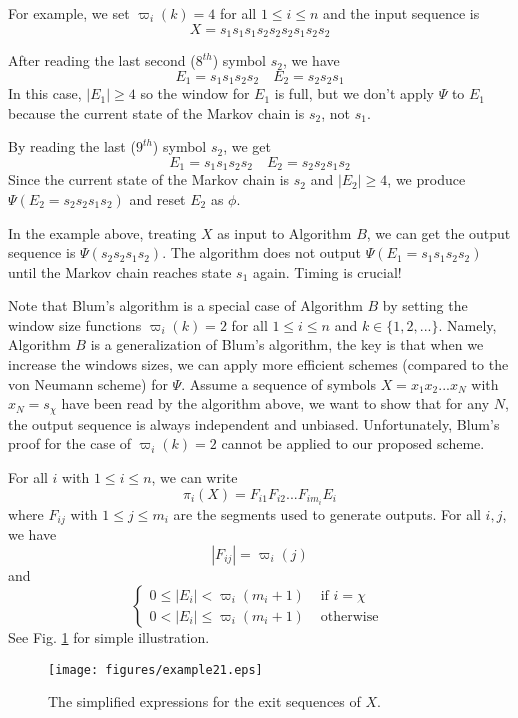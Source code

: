 \documentclass[journal]{IEEEtran}
\begin{document}
For example, we set $\varpi_i(k)=4$ for all $1\leq i\leq n$ and the input sequence is $$X=s_1s_1s_1s_2s_2s_2s_1s_2s_2$$

After reading the last second ($8^{th}$) symbol $s_2$, we have
$$E_1=s_1s_1s_2s_2 \quad E_2=s_2s_2s_1$$
In this case, $|E_1|\geq 4$ so the window for $E_1$ is full, but we don't apply $\Psi$ to $E_1$ because
the current state of the Markov chain is $s_2$, not $s_1$.

By reading the last ($9^{th}$) symbol $s_2$, we get
$$E_1=s_1s_1s_2s_2 \quad E_2=s_2s_2s_1s_2$$
Since the current state of the Markov chain is $s_2$ and $|E_2|\geq 4$,
we produce $\Psi(E_2=s_2s_2s_1s_2)$ and reset $E_2$ as $\phi$.

In the example above, treating $X$ as input to Algorithm $B$, we can get the output sequence is
$\Psi(s_2s_2s_1s_2)$. The algorithm does not output $\Psi(E_1=s_1s_1s_2s_2)$ until the Markov chain reaches state $s_1$ again. Timing is crucial!

Note that Blum's algorithm is a special case of Algorithm $B$ by setting the window size functions $\varpi_i(k)=2$ for all $1\leq i\leq n$ and $k\in \{1,2,...\}$.
Namely, Algorithm $B$ is a generalization of Blum's algorithm, the key is that when we increase the windows sizes, we can apply more efficient schemes (compared to the von Neumann scheme) for $\Psi$.
Assume a sequence of symbols $X=x_1x_2...x_N$ with $x_N=s_\chi$ have been read by the algorithm above, we want to show that for any $N$, the output
sequence is always independent and unbiased. Unfortunately, Blum's
proof for the case of $\varpi_i(k)=2$ cannot be applied to our proposed scheme.

For all $i$ with $1\leq i\leq n$, we can write
$$\pi_i(X)=F_{i1}F_{i2}...F_{im_i}E_i$$
where $F_{ij}$ with $1\leq j\leq m_i$ are the segments used to generate outputs.
For all $i,j$, we have
$$|F_{ij}|=\varpi_i(j)$$
and
$$\left\{\begin{array}{cc}
           0\leq |E_i|< \varpi_i(m_i+1) & \textrm{ if } i=\chi \\
           0< |E_i|\leq \varpi_i(m_i+1) & \textrm{ otherwise }
         \end{array}
\right.$$
See Fig. \ref{fig_example2} for simple illustration.

\begin{figure}[!h]
\centering
\texttt{[image: figures/example21.eps]}
\caption{The simplified expressions  for the exit sequences of $X$.}
\label{fig_example2}
\end{figure}
\end{document}
